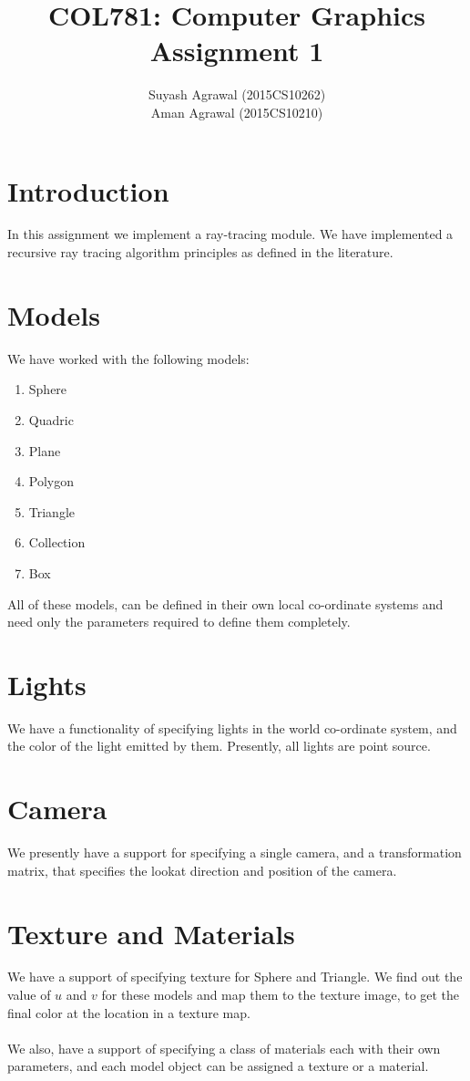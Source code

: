 \documentclass[12pt,a4paper]{article}
\title{COL781: Computer Graphics\\Assignment 1}
\author{Suyash Agrawal (2015CS10262)\\Aman Agrawal (2015CS10210)}
\begin{document}
\maketitle
\section{Introduction}
    In this assignment we implement a ray-tracing module. We have implemented a recursive ray tracing algorithm principles as defined in the literature.
    
\section{Models}
    We have worked with the following models:
    \begin{enumerate}
        \item Sphere
        \item Quadric
        \item Plane
        \item Polygon
        \item Triangle
        \item Collection
        \item Box        
    \end{enumerate}

    All of these models, can be defined in their own local co-ordinate systems and need only the parameters required to define them completely.

\section{Lights}
    We have a functionality of specifying lights in the world co-ordinate system, and the color of the light emitted by them. Presently, all lights are point source.

\section{Camera}
    We presently have a support for specifying a single camera, and a transformation matrix, that specifies the lookat direction and position of the camera.

\section{Texture and Materials}
    We have a support of specifying texture for Sphere and Triangle. We find out the value of $u$ and $v$ for these models and map them to the texture image, to get the final color at the location in a texture map.\\\\
    \noindent We also, have a support of specifying a class of materials each with their own parameters, and each model object can be assigned a texture or a material.
\end{document}
